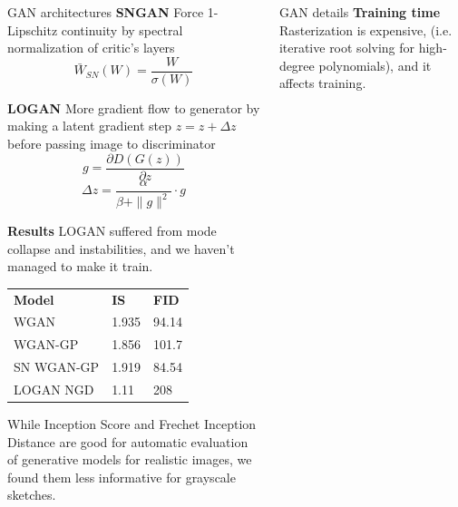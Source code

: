 \documentclass{beamer}
\newcommand{\paragraph}[1]{\noindent\textbf{#1}\quad}
\begin{document}
\begin{frame}[fragile]
\begin{columns}[T]
\begin{column}{.3\textwidth}
\begin{block}{GAN architectures}
\paragraph {SNGAN} \cite{miyato2018spectral} Force 1-Lipschitz continuity by spectral normalization of critic's layers
$$\bar W_{SN} (W) = \frac W {\sigma(W)} $$

\paragraph {LOGAN} \cite{wu2020logan} More gradient flow to generator by making a latent gradient step $z = z + \Delta z$ before passing image to discriminator
$$g = \frac{\partial D(G(z))}{\partial z}$$
$$\Delta z = \frac {\alpha} {\beta + \| g \|^2} \cdot g$$

\paragraph{Results} LOGAN suffered from mode collapse and instabilities, and we haven't managed to make it train. 

\begin{table}[]
	\begin{tabular}{lll}
		\textbf{Model} & \textbf{IS} & \textbf{FID} \\
		WGAN           & 1.935       & 94.14        \\
		WGAN-GP        & 1.856       & 101.7        \\
		SN WGAN-GP     & 1.919       & 84.54        \\
		LOGAN NGD      & 1.11        & 208         
	\end{tabular}
\end{table}

While Inception Score and Frechet Inception Distance are good for automatic evaluation of generative models for realistic images, we found them less informative for grayscale sketches.

\end{block}



\end{column}

\begin{column}{.33\textwidth}

\begin{block}{GAN details}
	\paragraph{Training time} Rasterization is expensive, (i.e. iterative root solving for high-degree polynomials), and it affects training. 
	

\end{block}
\end{column}
\end{columns}
\end{frame}
\end{document}
